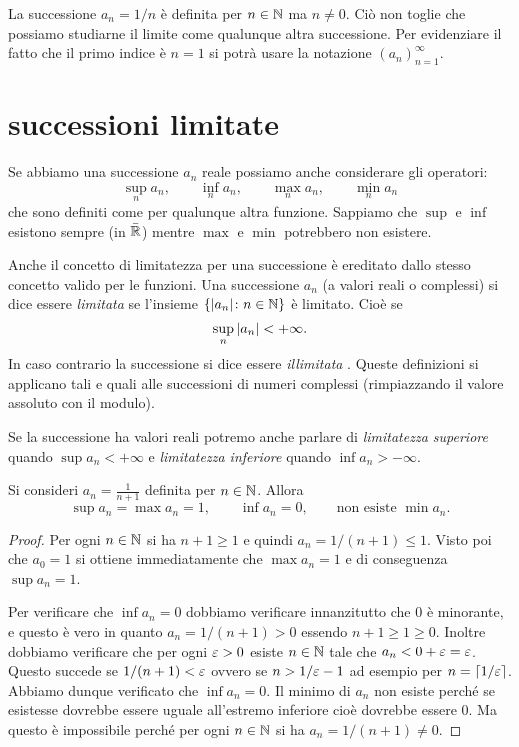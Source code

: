 \begin{example}
  La successione $a_n = 1/n$ è definita per $n\in {\mathbb N}$ ma $n\neq 0$.
  Ciò non toglie che possiamo studiarne il limite come qualunque altra
  successione. Per evidenziare il fatto che il primo indice è $n=1$
  si potrà usare la notazione $(a_n)_{n=1}^\infty$.
\end{example}
 
\section{successioni limitate}

Se abbiamo una successione $a_n$ reale possiamo anche considerare gli operatori:
\[
  \sup_n a_n, \qquad 
  \inf_n a_n, \qquad 
  \max_n a_n, \qquad 
  \min_n a_n 
\]
che sono definiti come per qualunque altra funzione. 
Sappiamo che $\sup$ e $\inf$ esistono sempre (in $\bar{{\mathbb R}}$) mentre $\max$ e $\min$
potrebbero non esistere.

Anche il concetto di limitatezza per una successione è ereditato dallo stesso 
concetto valido per le funzioni.
Una successione $a_n$ (a valori reali o complessi) si dice essere 
\emph{limitata}%
%
 se 
l'insieme $\{{\left|a_n\right|}\colon n \in {\mathbb N}\}$ è limitato. Cioè se 
\[
\sup_n {\left|a_n\right|} < +\infty.  
\]
In caso contrario la successione si dice essere \emph{illimitata}%
%
.
Queste definizioni si applicano tali e quali alle successioni di numeri 
complessi (rimpiazzando il valore assoluto con il modulo).

Se la successione ha valori reali potremo anche parlare di 
\emph{limitatezza superiore} quando $\sup a_n <+\infty$ 
e \emph{limitatezza inferiore} quando $\inf a_n > -\infty$.


\begin{example}
Si consideri $a_n = \frac{1}{n+1}$ definita per $n\in {\mathbb N}$.
Allora
\[
  \sup a_n = \max a_n = 1, \qquad
  \inf a_n = 0, \qquad \text{non esiste }\min a_n.
\]
\end{example}
\begin{proof}
Per ogni $n \in {\mathbb N}$ si ha $n+1\ge 1$ e quindi $a_n = 1/(n+1) \le 1$.
Visto poi che $a_0 = 1$ si ottiene immediatamente che $\max a_n = 1$
e di conseguenza $\sup a_n = 1$.

Per verificare che $\inf a_n = 0$ dobbiamo verificare innanzitutto
che $0$ è minorante, e questo è vero in quanto $a_n = 1/(n+1)> 0$ essendo $n+1\ge 1 \ge 0$.
Inoltre dobbiamo verificare che per ogni $\varepsilon >0$ esiste $n\in {\mathbb N}$ tale
che $a_n < 0 + \varepsilon = \varepsilon$. Questo succede se $1/(n+1) < \varepsilon$ ovvero
se $n > 1/\varepsilon -1$ ad esempio per $n=\lceil 1/\varepsilon\rceil$.
Abbiamo dunque verificato che $\inf a_n = 0$.
Il minimo di $a_n$ non esiste perché se esistesse dovrebbe essere uguale
all'estremo inferiore cioè dovrebbe essere $0$. Ma questo è impossibile
perché per ogni $n\in {\mathbb N}$ si ha $a_n = 1/(n+1)\neq 0$.
\end{proof}

